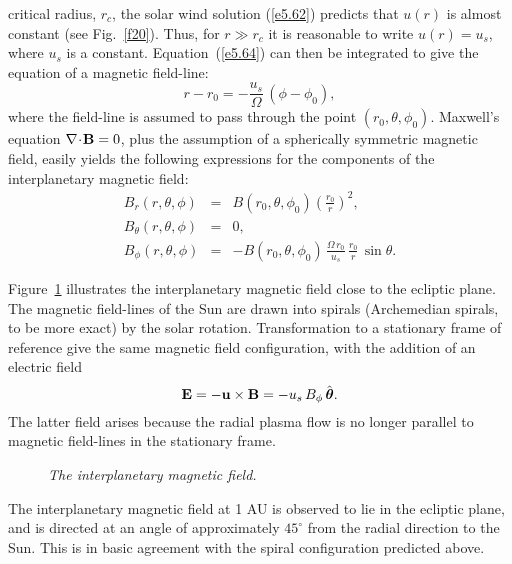 critical radius, $r_c$, the solar wind solution (\ref{e5.62}) predicts that $u(r)$
is almost constant (see Fig.~\ref{f20}). Thus, for $r\gg r_c$ it is reasonable
to write $u(r) = u_s$, where $u_s$ is a constant. Equation~(\ref{e5.64})
can then be integrated to give the equation of a magnetic field-line:
\begin{equation}
r-r_0 = -\frac{u_s}{{\Omega}}\,(\phi-\phi_0),
\end{equation}
where the field-line is assumed to pass through the point $(r_0,\theta,\phi_0)$.
Maxwell's equation $\nabla\!\cdot\!{\bf B} =0$, plus the assumption of a spherically
symmetric magnetic field, easily yields the following expressions for the
components of the interplanetary magnetic field:
\begin{eqnarray}\label{e5.66a}
B_r(r,\theta,\phi) &=& B(r_0,\theta,\phi_0)\left(\frac{r_0}{r}\right)^2,\\[0.5ex]
B_\theta(r,\theta,\phi) &=& 0,\\[0.5ex]
B_\phi(r,\theta,\phi)&=& - B(r_0,\theta,\phi_0)\,\frac{{\Omega}\,r_0}{u_s}
\,\frac{r_0}{r}\,\sin\theta.
\end{eqnarray}

Figure~\ref{f21} illustrates the interplanetary magnetic field close to the
ecliptic plane. The magnetic field-lines of the Sun are drawn into spirals
(Archemedian spirals, to be more exact) by the solar rotation. Transformation
to a stationary frame of reference give the same magnetic field configuration,
with the addition of an electric field
\begin{equation}
{\bf E} = - {\bf u} \times {\bf B} = -u_s\,B_\phi\,\hat{\mbox{\boldmath$\theta$}}.
\end{equation}
The latter field arises because the radial plasma flow is no longer parallel to
magnetic field-lines in the stationary frame. 

\begin{figure}
\epsfysize=4in
\centerline{}
\caption{\em The interplanetary magnetic field.}\label{f21}
\end{figure}

The interplanetary magnetic field at 1 AU is observed to lie in the
ecliptic plane, and is directed at an angle of approximately $45^\circ$ from
the radial direction to the Sun. This is in basic agreement with the spiral
configuration predicted above.

